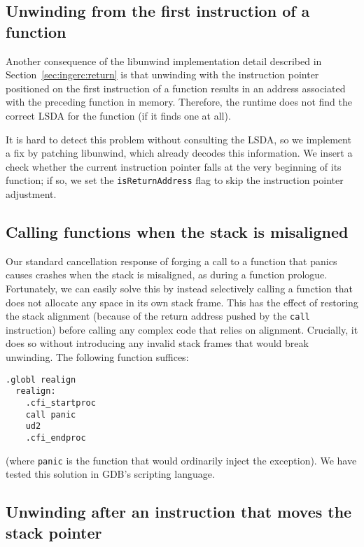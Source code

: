 \subsection{Unwinding from the first instruction of a function}
\label{sec:ingerc:start}

Another consequence of the libunwind implementation detail described in
Section~\ref{sec:ingerc:return} is that unwinding with the instruction pointer
positioned on the first instruction of a function results in an address associated
with the preceding function in memory.  Therefore, the runtime does not find the
correct LSDA for the function (if it finds one at all).

It is hard to detect this problem without consulting the LSDA, so we implement a fix
by patching libunwind, which already decodes this information.  We insert a check
whether the current instruction pointer falls at the very beginning of its function;
if so, we set the \texttt{isReturnAddress} flag to skip the instruction pointer
adjustment.


\subsection{Calling functions when the stack is misaligned}
\label{sec:ingerc:realign}

Our standard cancellation response of forging a call to a function that panics
causes crashes when the stack is misaligned, as during a function
prologue.  Fortunately, we can easily solve this by instead selectively calling a
function that does not allocate any space in its own stack frame.  This has the
effect of restoring the stack alignment (because of the return address pushed by the
\texttt{call} instruction) before calling any complex code that relies on alignment.
Crucially, it does so without introducing any invalid stack frames that would break
unwinding.  The following function suffices:
\begin{lstlisting}[language={[x86masm]Assembler},morekeywords=ud2]
  	.globl realign
  realign:
  	.cfi_startproc
  	call panic
  	ud2
  	.cfi_endproc
\end{lstlisting}

\noindent
(where \texttt{panic} is the function that would ordinarily inject the exception).
We have tested this solution in GDB's scripting language.


\subsection{Unwinding after an instruction that moves the stack pointer}
\label{sec:ingerc:boundary}

